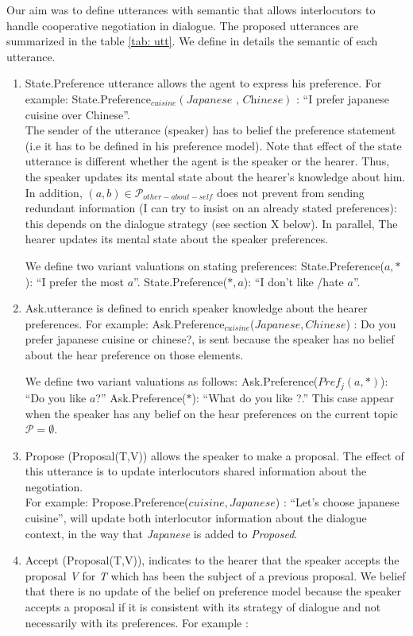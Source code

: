 \documentclass{llncs}
\begin{document}
\par  Our aim was to define utterances with semantic that allows interlocutors to handle cooperative negotiation in dialogue. The proposed utterances are summarized in the table \ref{tab: utt}. We define in details the semantic of each utterance.
\begin{enumerate}
	\item  State.Preference utterance allows the agent to express his preference. For example: State.Preference$_{cuisine}(\textit{Japanese , Chinese})$ : ``I prefer japanese cuisine over Chinese''. 
	\\The  sender of the utterance (speaker) has to belief the preference statement (i.e it has to be defined in his preference model). Note that effect of the state utterance is different whether the agent is the speaker or the hearer. Thus,  the speaker updates its mental state about the hearer's knowledge about him. In addition, $(a,b) \in \mathcal{P}_{other-about-self}$ does not prevent from sending redundant information (I can try to insist on an already stated preferences): this depends on the dialogue strategy (see section X below). In parallel, The hearer updates its mental state about the speaker preferences.	
	\par We define two variant valuations on stating preferences: 
	 	\subitem State.Preference(\textit{$a, *$}): ``I prefer the most $a$''.
	 	\subitem State.Preference(\textit{$*, a$}): ``I don't like /hate $a$''.
	 	\\
	\item Ask.utterance is defined to enrich speaker knowledge about the hearer preferences. For  example: Ask.Preference$_{cuisine}$(\textit{$Japanese , Chinese$}) : Do you prefer japanese cuisine or chinese?, is sent because the speaker has no belief about the hear preference on those elements. 
	\par We define two variant valuations as follows: 
	 	\subitem Ask.Preference(\textit{$Pref_{j}(a, *)$}): ``Do you like $a$?''
	 	\subitem Ask.Preference(\textit{$*$}): ``What do you like ?.'' This case appear when the speaker has any belief on the hear preferences on the current topic$\mathcal{P}= \emptyset$. 
	\\
	\item Propose (Proposal(T,V)) allows the speaker to make a proposal. The effect of this utterance is to update interlocutors shared information about the negotiation.
	\\ For example: Propose.Preference(\textit{$cuisine,Japanese$}) : ``Let's choose japanese cuisine'', will update both interlocutor information about the dialogue context, in the way that \textit{Japanese} is added to \textit{Proposed}.
	\\
	\item Accept (Proposal(T,V)), indicates to the hearer that the speaker accepts the proposal \textit{V} for \textit{T} which has been the subject of a previous  proposal. We belief that there is no update of the belief on preference model because the speaker accepts a proposal if it is consistent with its strategy of dialogue and not necessarily with its preferences. For example : 
	

\end{enumerate}
\end{document}

